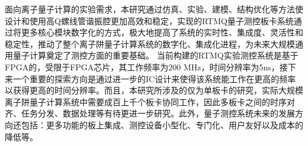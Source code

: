 \begin{conclusion}
面向离子量子计算的实验需求，本研究通过仿真、实验、建模、结构优化等方法使设计和使用高Q螺线管谐振腔更加高效和稳定，实现的RTMQ量子测控板卡系统通过将更多核心模块数字化的方式，极大地提高了系统的实时性、集成度、灵活性和稳定性，推动了整个离子阱量子计算系统的数字化、集成化进程，为未来大规模通用量子计算奠定了测控方面的重要基础。
当前构建的RTMQ实验测控系统是基于FPGA的，受限于FPGA芯片，其工作频率为200 MHz，时间分辨率为5ns，接下来一个重要的探索方向是通过进一步的IC设计来使得该系统能工作在更高的频率以获得更高的时间分辨率。而且，本研究所涉及的仅为单板卡的研究，实际大规模离子阱量子计算系统中需要成百上千个板卡协同工作，因此多板卡之间的时序对齐、任务分发、数据处理等有待更进一步研究。此外，量子测控系统未来的发展方向还包括：更多功能的板上集成、测控设备小型化、专门化、用户友好以及成本的降低等。


\end{conclusion}


